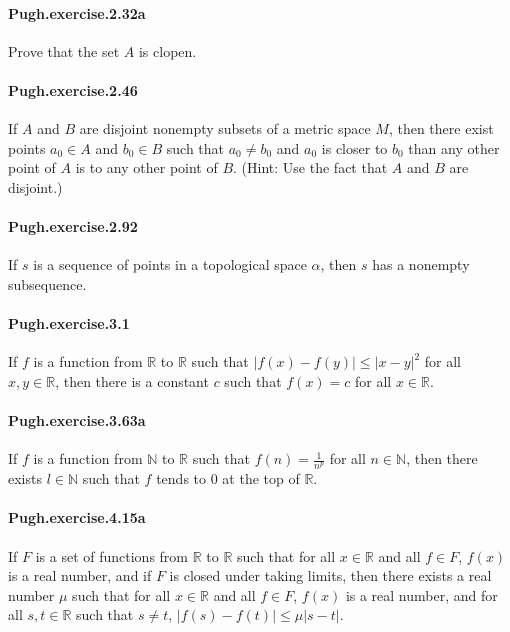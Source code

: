 \documentclass{article}
\begin{document}
\paragraph{Pugh.exercise.2.32a} Prove that the set $A$ is clopen.

\paragraph{Pugh.exercise.2.46} If $A$ and $B$ are disjoint nonempty subsets of a metric space $M$, then there exist points $a_0 \in A$ and $b_0 \in B$ such that $a_0 \neq b_0$ and $a_0$ is closer to $b_0$ than any other point of $A$ is to any other point of $B$. (Hint: Use the fact that $A$ and $B$ are disjoint.)

\paragraph{Pugh.exercise.2.92} If $s$ is a sequence of points in a topological space $α$, then $s$ has a nonempty subsequence.

\paragraph{Pugh.exercise.3.1} If $f$ is a function from $\mathbb{R}$ to $\mathbb{R}$ such that $|f(x) - f(y)| \leq |x - y|^2$ for all $x, y \in \mathbb{R}$, then there is a constant $c$ such that $f(x) = c$ for all $x \in \mathbb{R}$.

\paragraph{Pugh.exercise.3.63a} If $f$ is a function from $\mathbb{N}$ to $\mathbb{R}$ such that $f(n) = \frac{1}{n^p}$ for all $n \in \mathbb{N}$, then there exists $l \in \mathbb{N}$ such that $f$ tends to $0$ at the top of $\mathbb{R}$.

\paragraph{Pugh.exercise.4.15a} If $F$ is a set of functions from $\mathbb{R}$ to $\mathbb{R}$ such that for all $x \in \mathbb{R}$ and all $f \in F$, $f(x)$ is a real number, and if $F$ is closed under taking limits, then there exists a real number $\mu$ such that for all $x \in \mathbb{R}$ and all $f \in F$, $f(x)$ is a real number, and for all $s, t \in \mathbb{R}$ such that $s \neq t$, $|f(s) - f(t)| \leq \mu |s - t|$.
\end{document}
